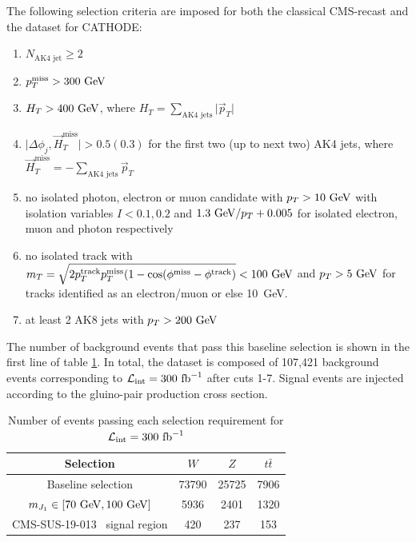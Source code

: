 \documentclass[prd, twocolumn, superscriptaddress,floatfix, nofootinbib, preprintnumbers]{revtex4-2}
\begin{document}
The following selection criteria are imposed for both the classical CMS-recast and the dataset for CATHODE:
\begin{enumerate}
\item $N_{\text{AK4 jet}}\geq 2$
\item $p_T^\text{miss} > 300~{\rm GeV}$
\item $H_T > 400~{\rm GeV}$, where $H_T = \sum_\text{AK4 jets} \vert \vec{p}_T \vert$
\item $\vert \Delta \phi_j , \vec{H}_T^\text{miss}\vert > 0.5 (0.3)$ for the first two (up to next two) AK4 jets, where $\vec{H}_T^\text{miss}=-\sum_\text{AK4 jets} \vec{p}_T$
\item no isolated photon, electron or muon candidate with $p_T > 10~{\rm GeV}$ with isolation variables $I < 0.1 , 0.2 $ and $1.3~{\rm GeV}/p_T +0.005$ for isolated electron, muon and photon respectively
\item no isolated track with\\ $m_T = \sqrt{2 p_T^\text{track} p_T^\text{miss} (1-\cos (\phi^\text{miss}-\phi^\text{track})}<100~{\rm GeV}$ and $p_T > 5~{\rm GeV}$ for tracks identified as an electron/muon or else 10~GeV.
\item at least 2 AK8 jets with $p_T > 200~{\rm GeV}$
\end{enumerate}
The number of background events that pass this baseline selection is shown in the first line of table \ref{tab:eventcounts}. In total, the dataset is composed of 107,421 background events corresponding to $\mathcal{L}_\text{int}=300~{\rm fb}^{-1}$ after cuts 1-7. Signal events are injected according to the gluino-pair production cross section.

\begin{table}[t]
\begin{center}
\begin{tabular}{| c | c c c |}
\hline
Selection & $W$ & $Z$ &$t\bar{t}$ \\
\hline
Baseline selection&73790&25725&7906\\
$m_{J_1} \in [70~{\rm GeV},100~{\rm GeV}]$&5936&2401&1320\\
CMS-SUS-19-013~\cite{CMS:2020fia} signal region&420&237&153\\
\hline
\end{tabular}
\caption{Number of events passing each selection requirement for $\mathcal{L}_\text{int}=300~{\rm fb}^{-1}$ }
\label{tab:eventcounts}
\end{center}
\end{table}
\end{document}
